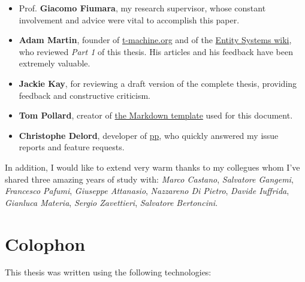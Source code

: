 \documentclass[oneside, 12pt, a4paper, openany]{book}
\begin{document}
\begin{itemize}
\item
  Prof. \textbf{Giacomo Fiumara}, my research supervisor, whose constant
  involvement and advice were vital to accomplish this paper.
\item
  \textbf{Adam Martin}, founder of
  \href{http://t-machine.org/}{t-machine.org} and of the
  \href{http://entity-systems.wikidot.com/}{Entity Systems wiki}, who
  reviewed \emph{Part 1} of this thesis. His articles and his feedback
  have been extremely valuable.
\item
  \textbf{Jackie Kay}, for reviewing a draft version of the complete
  thesis, providing feedback and constructive criticism.
\item
  \textbf{Tom Pollard}, creator of
  \href{https://github.com/tompollard/phd_thesis_markdown}{the Markdown
  template} used for this document.
\item
  \textbf{Christophe Delord}, developer of
  \href{https://github.com/CDSoft/pp}{pp}, who quickly answered my issue
  reports and feature requests.
\end{itemize}

In addition, I would like to extend very warm thanks to my collegues
whom I've shared three amazing years of study with: \emph{Marco
Castano}, \emph{Salvatore Gangemi}, \emph{Francesco Pafumi},
\emph{Giuseppe Attanasio}, \emph{Nazzareno Di Pietro}, \emph{Davide
Iuffrida}, \emph{Gianluca Materia}, \emph{Sergio Zavettieri},
\emph{Salvatore Bertoncini}.

\chapter*{Colophon}\label{colophon}

This thesis was written using the following technologies:
\end{document}
